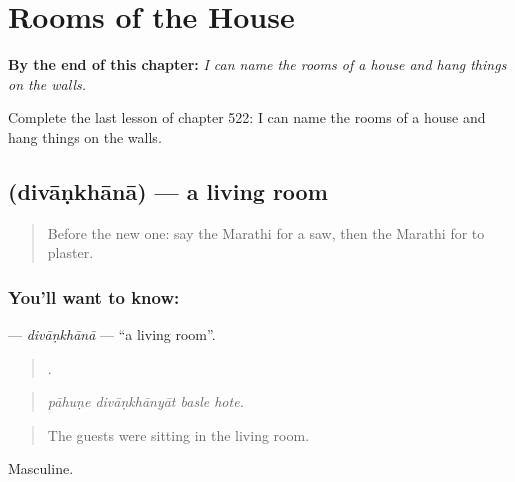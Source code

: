 
\chapter{Rooms of the House}
\label{ch:mr-rooms-of-the-house}

\begin{chapteropening}
\textbf{By the end of this chapter:} \emph{I can name the rooms of a house and hang things on the walls.}

Complete the last lesson of chapter 522: I can name the rooms of a house and hang things on the walls.
\end{chapteropening}

\section[\texorpdfstring{\mr{दिवाणखाना} (divāṇkhānā)}{दिवाणखाना (divāṇkhānā)}]{ (divāṇkhānā) — a living room}

\label{lesson:MR-C522-divankhana}



\begin{quote}
Before the new one: say the Marathi for a saw, then the Marathi for to plaster.
\end{quote}

\subsection*{You'll want to know: }
\textbf{} — \emph{divāṇkhānā} — \textquotedblleft{}a living room\textquotedblright{}.

\begin{quote}
   .
\end{quote}

\begin{quote}
\emph{pāhuṇe divāṇkhānyāt basle hote.}
\end{quote}

\begin{quote}
The guests were sitting in the living room.
\end{quote}

Masculine.

